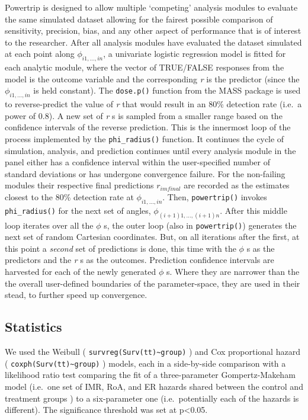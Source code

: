 \documentclass[review, authoryear]{elsarticle}
\begin{document}
Powertrip is designed to allow multiple `competing' analysis modules to
evaluate the same simulated dataset allowing for the fairest possible
comparison of sensitivity, precision, bias, and any other aspect of
performance that is of interest to the researcher. After all analysis
modules have evaluated the dataset simulated at each point along
\(\phi_{i1,\dots,in}\), a univariate logistic regression model is fitted
for each analytic module, where the vector of TRUE/FALSE responses from
the model is the outcome variable and the corresponding \emph{r} is the
predictor (since the \(\phi_{i1,\dots,in}\) is held constant). The
\texttt{dose.p()} function from the MASS package \citep{MASS} is used to
reverse-predict the value of \emph{r} that would result in an 80\%
detection rate (i.e.~a power of 0.8). A new set of \emph{r} s is sampled
from a smaller range based on the confidence intervals of the reverse
prediction. This is the innermost loop of the process implemented by the
\texttt{phi\_radius()} function. It continues the cycle of simulation,
analysis, and prediction continues until every analysis module in the
panel either has a confidence interval within the user-specified number
of standard deviations or has undergone convergence failure. For the
non-failing modules their respective final predictions \(r_{im final}\)
are recorded as the estimates closest to the 80\% detection rate at
\(\phi_{i1,\dots,in}\). Then, \texttt{powertrip()} invokes
\texttt{phi\_radius()} for the next set of angles,
\(\phi_{(i+1)1,\dots,(i+1)n}\). After this middle loop iterates over all
the \(\phi\) s, the outer loop (also in \texttt{powertrip()}) generates
the next set of random Cartesian coordinates. But, on all iterations
after the first, at this point a \emph{second} set of predictions is
done, this time with the \(\phi\) s as the predictors and the \emph{r} s
as the outcomes. Prediction confidence intervals are harvested for each
of the newly generated \(\phi\) s. Where they are narrower than the the
overall user-defined boundaries of the parameter-space, they are used in
their stead, to further speed up convergence.

\subsection{Statistics}\label{statistics}

We used the Weibull ( \texttt{survreg(Surv(tt)\textasciitilde{}group)} )
and Cox proportional hazard (
\texttt{coxph(Surv(tt)\textasciitilde{}group)} ) models, each in a
side-by-side comparison with a likelihood ratio test comparing the fit
of a three-parameter Gompertz-Makeham model (i.e.~one set of IMR, RoA,
and ER hazards shared between the control and treatment groups ) to a
six-parameter one (i.e.~potentially each of the hazards is different).
The significance threshold was set at p\textless{}0.05.
\end{document}
